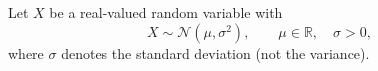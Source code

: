 Let $X$ be a real-valued random variable with
\[
  X \sim \mathcal{N}(\mu, \sigma^2), \qquad \mu \in \mathbb{R}, \quad \sigma > 0,
\]
where $\sigma$ denotes the standard deviation (not the variance).

